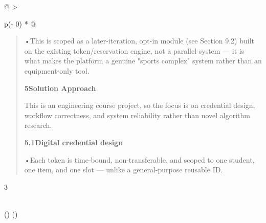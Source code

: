 \documentclass[
]{article}
\begin{document}
\begin{longtable}[]{@{}
  >{\raggedright\arraybackslash}p{(\columnwidth - 0\tabcolsep) * }@{}}
\begin{minipage}[b]{\linewidth}
\begin{quote}
•This is scoped as a later-iteration, opt-in module (see Section 9.2)
built on the existing token/reservation engine, not a parallel system
--- it is what makes the platform a genuine "sports complex" system
rather than an equipment-only tool.

\textbf{5Solution Approach}

This is an engineering course project, so the focus is on credential
design, workflow correctness, and system reliability rather than novel
algorithm research.

\textbf{5.1Digital credential design}

•Each token is time-bound, non-transferable, and scoped to one student,
one item, and one slot --- unlike a general-purpose reusable ID.
\end{quote}

3\strut
\end{minipage} \\
\midrule()
\endhead
\bottomrule()
\end{longtable}
\end{document}
